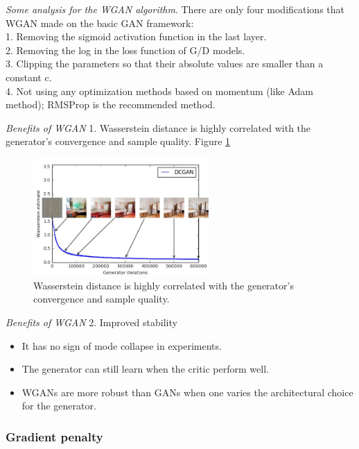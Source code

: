\documentclass[english]{article}
\begin{document}
\item {\emph{Some analysis for the WGAN algorithm}}.
There are only four modifications that WGAN made on the basic GAN framework:
~\\
1. Removing the sigmoid activation function in the last layer.\\
2. Removing the log in the loss function of G/D models.\\
3. Clipping the parameters so that their absolute values are smaller than a constant c.\\
4. Not using any optimization methods based on momentum (like Adam method); RMSProp is the recommended method.





\item {\emph{Benefits of WGAN}}
1. Wasserstein distance is highly correlated with the generator's convergence and sample quality. Figure \ref{wass_qual}
\begin{figure}[h!]
  \centering
  \includegraphics[width=0.6\textwidth]{WassGAN_loss_function.jpg}
      \caption{Wasserstein distance is highly correlated with the generator's convergence and sample quality.}
    \label{wass_qual}
\end{figure}




\item {\emph{Benefits of WGAN}}
2. Improved stability
\begin{itemize}
  \item It has no sign of mode collapse in experiments.
  \item The generator can still learn when the critic perform well.
  \item WGANs are more robust than GANs when one varies the architectural choice for the generator.
  \end{itemize}
\eenum



\subsubsection{Gradient penalty}
\end{document}
